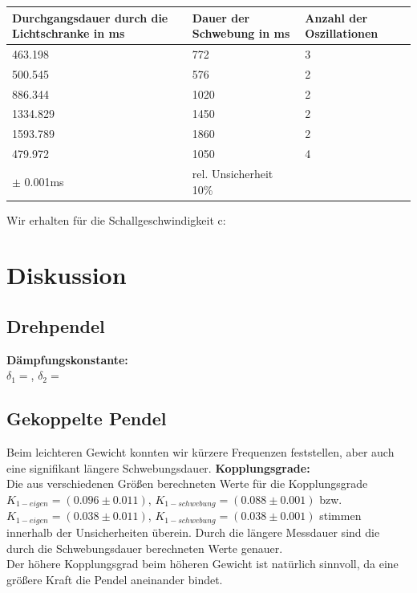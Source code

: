 \documentclass{article}
\begin{document}
\begin{flushleft}
\begin{tabular}{|l|l|l|}
\hline Durchgangsdauer durch die Lichtschranke in ms & Dauer der Schwebung in ms & Anzahl der Oszillationen \\
\hline
463.198 & 772 & 3 \\
500.545 &
576 & 2 \\
886.344 &
1020 &2\\

1334.829&
1450&2 \\

1593.789&
1860& 2 \\

479.972&
1050 & 4 \\
\hline
$\pm$ 0.001ms & rel. Unsicherheit 10\% &\\
\hline
\end{tabular}
\end{flushleft}
Wir erhalten für die Schallgeschwindigkeit c:
\begin{center}
\end{center}

\section{Diskussion}
\subsection*{Drehpendel}
\textbf{Dämpfungskonstante:}\\
$\delta_1=$, $\delta_2=$

\subsection*{Gekoppelte Pendel}
Beim leichteren Gewicht konnten wir kürzere Frequenzen feststellen, aber auch eine signifikant längere Schwebungsdauer.
\textbf{Kopplungsgrade:}\\
Die aus verschiedenen Größen berechneten Werte für die Kopplungsgrade $K_{1-eigen}=(0.096 \pm 0.011)$, $K_{1-schwebung}=(0.088 \pm 0.001)$ bzw. $K_{1-eigen}=(0.038 \pm 0.011)$, $K_{1-schwebung}=(0.038 \pm 0.001)$ stimmen innerhalb der Unsicherheiten überein.
Durch die längere Messdauer sind die durch die Schwebungsdauer berechneten Werte genauer.
\\
Der höhere Kopplungsgrad beim höheren Gewicht ist natürlich sinnvoll, da eine größere Kraft die Pendel aneinander bindet.
\end{document}

